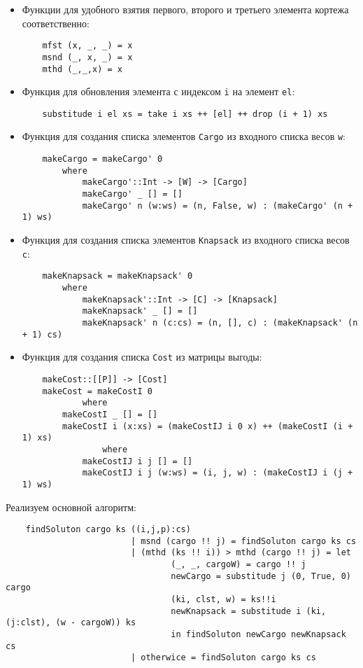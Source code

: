 \documentclass[14pt,a4paper]{extarticle}
\begin{document}
	\begin{itemize}
		\item Функции для удобного взятия первого, второго и третьего элемента кортежа соответственно: 
		\lstset{language=haskell}
		\begin{lstlisting}
	mfst (x, _, _) = x
	msnd (_, x, _) = x
	mthd (_,_,x) = x
		\end{lstlisting}
		\item Функция для обновления элемента с индексом \texttt{i} на элемент \texttt{el}:
		\lstset{language=haskell}
		\begin{lstlisting}
	substitude i el xs = take i xs ++ [el] ++ drop (i + 1) xs
		\end{lstlisting}
		\item Функция для создания списка элементов \texttt{Cargo} из входного списка весов \texttt{w}:
		\begin{lstlisting}
	makeCargo = makeCargo' 0 
        where
            makeCargo'::Int -> [W] -> [Cargo]
            makeCargo' _ [] = []
            makeCargo' n (w:ws) = (n, False, w) : (makeCargo' (n + 1) ws)
		\end{lstlisting}
		\item Функция для создания списка элементов \texttt{Knapsack} из входного списка весов \texttt{с}:
		\begin{lstlisting}
	makeKnapsack = makeKnapsack' 0 
        where
            makeKnapsack'::Int -> [C] -> [Knapsack]
            makeKnapsack' _ [] = []
            makeKnapsack' n (c:cs) = (n, [], c) : (makeKnapsack' (n + 1) cs) 
		\end{lstlisting}
		
		\item Функция для создания списка \texttt{Cost} из матрицы выгоды:
		\begin{lstlisting}
	makeCost::[[P]] -> [Cost]
	makeCost = makeCostI 0
            where
        makeCostI _ [] = []
        makeCostI i (x:xs) = (makeCostIJ i 0 x) ++ (makeCostI (i + 1) xs)
                where
            makeCostIJ i j [] = []  
            makeCostIJ i j (w:ws) = (i, j, w) : (makeCostIJ i (j + 1) ws)
		\end{lstlisting}
	\end{itemize}
	
	Реализуем основной алгоритм:
	\begin{lstlisting}
    findSoluton cargo ks ((i,j,p):cs) 
                         | msnd (cargo !! j) = findSoluton cargo ks cs
                         | (mthd (ks !! i)) > mthd (cargo !! j) = let
                                 (_, _, cargoW) = cargo !! j
                                 newCargo = substitude j (0, True, 0) cargo
                                 (ki, clst, w) = ks!!i
                                 newKnapsack = substitude i (ki, (j:clst), (w - cargoW)) ks
                                 in findSoluton newCargo newKnapsack cs
                         | otherwice = findSoluton cargo ks cs
	\end{lstlisting}
\end{document}
